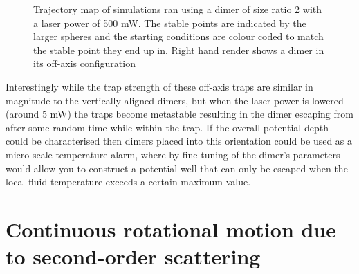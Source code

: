 \begin{figure}[h!]
\begin{subfigure}{0.32\linewidth}
		\caption{}
	\end{subfigure}
	\captionsetup{hangindent=2.35cm}
	\caption{Trajectory map of simulations ran using a dimer of size ratio 2 with a laser power of 500 mW. The stable points are indicated by the larger spheres and the starting conditions are colour coded to match the stable point they end up in. Right hand render shows a dimer in its off-axis configuration}
\end{figure}

Interestingly while the trap strength of these off-axis traps are 
similar in magnitude to the vertically aligned dimers, but when 
the laser power is lowered (around 5 mW) the traps become metastable 
resulting in the dimer escaping from after some random time while 
within the trap. If the overall potential depth could be characterised 
then dimers placed into this orientation could be used as a 
micro-scale temperature alarm, where by fine tuning of the dimer's 
parameters would allow you to construct a potential well that can 
only be escaped when the local fluid temperature exceeds a certain maximum value.  

\section{Continuous rotational motion due to second-order scattering}

